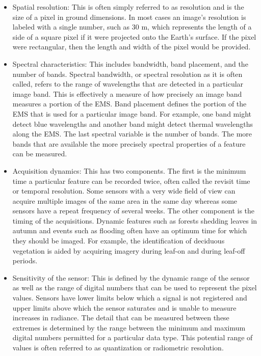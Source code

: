     \begin{itemize}
        \item Spatial resolution: This is often simply referred to as resolution and is the size of a pixel in ground dimensions. 
        In most cases an image's resolution is labeled with a single number, such as 30 m, which represents the length of a side of a square pixel if it were projected onto the Earth's surface.
        If the pixel were rectangular, then the length and width of the pixel would be provided.
        \item Spectral characteristics: This includes bandwidth, band placement, and the number of bands.
        Spectral bandwidth, or spectral resolution as it is often called, refers to the range of wavelengths that are detected in a particular image band.
        This is effectively a measure of how precisely an image band measures a portion of the EMS.
        Band placement defines the portion of the EMS that is used for a particular image band.
        For example, one band might detect blue wavelengths and another band might detect thermal wavelengths along the EMS.
        The last spectral variable is the number of bands. The more bands that are available the more precisely spectral properties of a feature can be measured.
        \item Acquisition dynamics: This has two components. The first is the minimum time a particular feature can be recorded twice, often called the revisit time or temporal resolution.
        Some sensors with a very wide field of view can acquire multiple images of the same area in the same day whereas some sensors have a repeat frequency of several weeks.
        The other component is the timing of the acquisitions. 
        Dynamic features such as forests shedding leaves in autumn and events such as flooding often have an optimum time for which they should be imaged.
        For example, the identification of deciduous vegetation is aided by acquiring imagery during leaf-on and during leaf-off periods.
        \item Sensitivity of the sensor: This is defined by the dynamic range of the sensor as well as the range of digital numbers that can be used to represent the pixel values.
        Sensors have lower limits below which a signal is not registered and upper limits above which the sensor saturates and is unable to measure increases in radiance.
        The detail that can be measured between these extremes is determined by the range between the minimum and maximum digital numbers permitted for a particular data type.
        This potential range of values is often referred to as quantization or radiometric resolution.
    \end{itemize}
    
